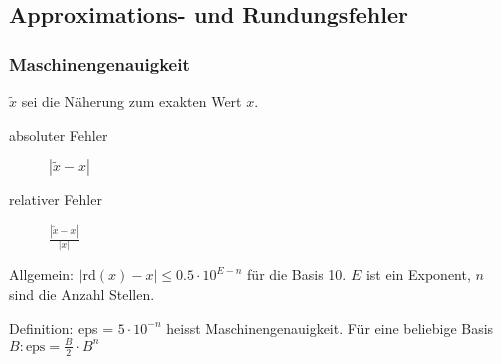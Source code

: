 \subsection{Approximations- und Rundungsfehler}
\subsubsection{Maschinengenauigkeit}
$\tilde{x}$ sei die Näherung zum exakten Wert $x$.
\begin{description}
 \item [absoluter Fehler] $|\tilde{x} - x|$ 
 \item [relativer Fehler] $\frac{|\tilde{x} - x|}{|x|}$ 
\end{description}

Allgemein: $|$rd$(x) - x| \leq 0.5 \cdot 10^{E-n}$ für die Basis 10. $E$ ist ein Exponent, $n$ sind die Anzahl Stellen.

Definition: eps = $5 \cdot 10^{-n}$ heisst Maschinengenauigkeit. Für eine beliebige Basis $B: \mbox{eps} = \frac{B}{2} \cdot B^n$